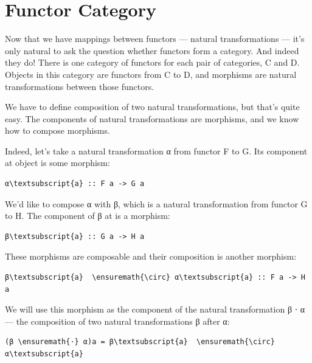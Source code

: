 \section{Functor Category}\label{functor-category}

Now that we have mappings between functors --- natural transformations
--- it's only natural to ask the question whether functors form a
category. And indeed they do! There is one category of functors for each
pair of categories, C and D. Objects in this category are functors from
C to D, and morphisms are natural transformations between those
functors.

We have to define composition of two natural transformations, but that's
quite easy. The components of natural transformations are morphisms, and
we know how to compose morphisms.

Indeed, let's take a natural transformation α from functor F to G. Its
component at object  is some morphism:

\begin{Verbatim}[commandchars=\\\{\}]
α\textsubscript{a} :: F a -> G a
\end{Verbatim}
We'd like to compose α with β, which is a natural transformation from
functor G to H. The component of β at  is a morphism:

\begin{Verbatim}[commandchars=\\\{\}]
β\textsubscript{a} :: G a -> H a
\end{Verbatim}
These morphisms are composable and their composition is another
morphism:

\begin{Verbatim}[commandchars=\\\{\}]
β\textsubscript{a}  \ensuremath{\circ} α\textsubscript{a} :: F a -> H a
\end{Verbatim}
We will use this morphism as the component of the natural transformation
β ⋅ α --- the composition of two natural transformations β after α:

\begin{Verbatim}[commandchars=\\\{\}]
(β \ensuremath{⋅} α)a = β\textsubscript{a}  \ensuremath{\circ} α\textsubscript{a}
\end{Verbatim}

\begin{figure}[H]
\centering
{}
\end{figure}

